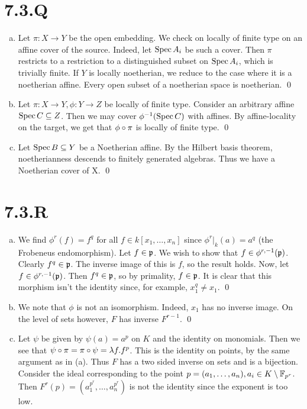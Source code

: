 \documentclass{article}
\begin{document}
\section{7.3.Q}
\begin{enumerate}[a.]
    \item Let $\pi: X \to Y$ be the open embedding. We check on locally of finite
          type on an affine cover of the source. Indeed, let $\operatorname{Spec} A_i$ be
          such a cover. Then $\pi$ restricts to a restriction to a
          distinguished subset on $\operatorname{Spec} A_i$, which is trivially finite. If
          $Y$ is locally noetherian, we reduce to the case where it is
          a noetherian affine. Every open subset of a noetherian space is noetherian.
          \qed
    \item Let $\pi: X \to Y, \phi: Y \to Z$ be locally of finite type. Consider an arbitrary
          affine $\operatorname{Spec} C \subseteq Z$. Then we may cover $\phi^{-1}(\operatorname{Spec}
              C)$ with
          affines. By affine-locality on the target, we get that $\phi \circ
              \pi$
          is locally of finite type. \qed
    \item Let $\operatorname{Spec} B \subseteq Y$ be a Noetherian affine. By the Hilbert basis
          theorem, noetherianness descends to finitely generated algebras. Thus we have a
          Noetherian cover of X. \qed
\end{enumerate}

\section{7.3.R}
\begin{enumerate}[a.]
    \item We find $\phi^r(f)=f^q$ for all $f \in k[x_1, \dots, x_n]$ since
          $\phi^r|_k(a)=a^q$ (the Frobeneus endomorphism). Let
          $f \in \mathfrak{p}$. We wish to show that $f \in \phi^{r,-1}(\mathfrak{p})$. Clearly
          $f^q \in \mathfrak{p}$. The inverse image of this is $f$, so
          the result holds. Now, let $f \in \phi^{r,-1}(\mathfrak{p})$. Then $f^q \in \mathfrak{p}$,
          so by primality, $f \in \mathfrak{p}$. It is clear that this morphism isn't
          the identity since, for example, $x_1^q \neq x_1$. \qed
    \item We note that $\phi$ is not an isomorphism. Indeed,
          $x_1$ has no inverse image. On the level of sets however,
          $F$ has inverse $F^{r-1}$. \qed
    \item Let $\psi$ be given by $\psi(a)=a^p$ on
          $K$ and the identity on monomials. Then we see that
          $\psi \circ \pi = \pi \circ \psi = \lambda f.f^p$. This is the identity on points, by the same argument
          as in (a). Thus $F$ has a two sided inverse on sets and is
          a bijection. Consider the ideal corresponding to the point
          $p=(a_1, \dots, a_n), a_i \in K \setminus \mathbb{F}_{p^r}$. Then $F^{r}(p)=(a_1^{p^{r}}, \dots,
              a_n^{p^{r}})$ is not the identity since
          the exponent is too low.
\end{enumerate}
\end{document}
